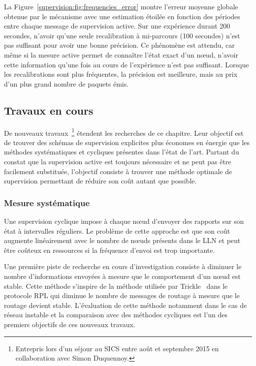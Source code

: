 La Figure~\ref{supervision:fig:frequencies_error} montre l'erreur moyenne globale obtenue par le mécanisme avec une estimation étoilée en fonction des périodes entre chaque message de supervision active.
Sur une expérience durant 200 secondes, n'avoir qu'une seule recalibration à mi-parcours (100 secondes) n'est pas suffisant pour avoir une bonne précision.
Ce phénomène est attendu, car même si la mesure active permet de connaître l'état exact d'un nœud, n'avoir cette information qu'une fois au cours de l'expérience n'est pas suffisant.
Lorsque les recalibrations sont plus fréquentes, la précision est meilleure, mais au prix d'un plus grand nombre de paquets émis.

\subsection{Travaux en cours}
\label{supervision:ingoing}

De nouveaux travaux~\footnote{Entrepris lors d'un séjour au \ac{SICS} entre août et septembre 2015 en collaboration avec Simon Duquennoy.} étendent les recherches de ce chapitre.
Leur objectif est de trouver des schémas de supervision explicites plus économes en énergie que les méthodes systématiques et cycliques présentes dans l'état de l'art.
Partant du constat que la supervision active est toujours nécessaire et ne peut pas être facilement substituée, l'objectif consiste à trouver une méthode optimale de supervision permettant de réduire son coût autant que possible.

\subsubsection{Mesure systématique}

Une supervision cyclique impose à chaque nœud d'envoyer des rapports sur son état à intervalles réguliers.
Le problème de cette approche est que son coût augmente linéairement avec le nombre de nœuds présents dans le \ac{LLN} et peut être coûteux en ressources si la fréquence d'envoi est trop importante.

Une première piste de recherche en cours d'investigation consiste à diminuer le nombre d'informations envoyées à mesure que le comportement d'un nœud est stable.
Cette méthode s'inspire de la méthode utilisée par Trickle~\cite{rfc6206} dans le protocole \ac{RPL} qui diminue le nombre de messages de routage à mesure que le routage devient stable.
L'évaluation de cette méthode notamment dans le cas de réseau instable et la comparaison avec des méthodes cycliques est l'un des premiers objectifs de ces nouveaux travaux.

